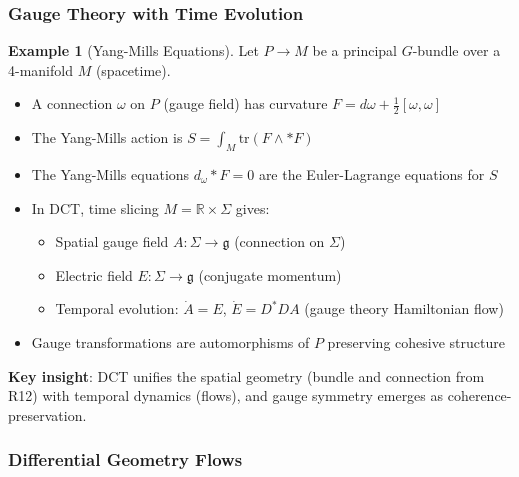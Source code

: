 \documentclass[11pt]{article}
\theoremstyle{definition}
\newtheorem{example}[theorem]{Example}
\begin{document}
\subsubsection{Gauge Theory with Time Evolution}

\begin{example}[Yang-Mills Equations]
Let $P \to M$ be a principal $G$-bundle over a 4-manifold $M$ (spacetime).

\begin{itemize}
\item A connection $\omega$ on $P$ (gauge field) has curvature $F = d\omega + \frac{1}{2}[\omega, \omega]$
\item The Yang-Mills action is $S = \int_M \text{tr}(F \wedge *F)$
\item The Yang-Mills equations $d_\omega *F = 0$ are the Euler-Lagrange equations for $S$
\item In DCT, time slicing $M = \mathbb{R} \times \Sigma$ gives:
  \begin{itemize}
  \item Spatial gauge field $A : \Sigma \to \mathfrak{g}$ (connection on $\Sigma$)
  \item Electric field $E : \Sigma \to \mathfrak{g}$ (conjugate momentum)
  \item Temporal evolution: $\dot{A} = E$, $\dot{E} = D^* D A$ (gauge theory Hamiltonian flow)
  \end{itemize}
\item Gauge transformations are automorphisms of $P$ preserving cohesive structure
\end{itemize}

\textbf{Key insight}: DCT unifies the spatial geometry (bundle and connection from R12) with temporal dynamics (flows), and gauge symmetry emerges as coherence-preservation.
\end{example}

\subsubsection{Differential Geometry Flows}
\end{document}
